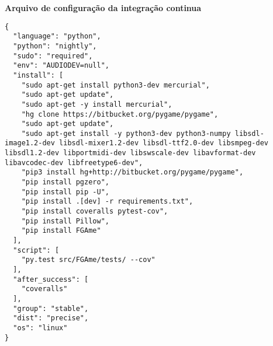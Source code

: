 \pagestyle{empty}


{\LARGE \textbf{Arquivo de configuração da integração continua}}

\begin{anexosenv}
\begin{lstlisting}
{
  "language": "python",
  "python": "nightly",
  "sudo": "required",
  "env": "AUDIODEV=null",
  "install": [
    "sudo apt-get install python3-dev mercurial",
    "sudo apt-get update",
    "sudo apt-get -y install mercurial",
    "hg clone https://bitbucket.org/pygame/pygame",
    "sudo apt-get update",
    "sudo apt-get install -y python3-dev python3-numpy libsdl-image1.2-dev libsdl-mixer1.2-dev libsdl-ttf2.0-dev libsmpeg-dev libsdl1.2-dev libportmidi-dev libswscale-dev libavformat-dev libavcodec-dev libfreetype6-dev",
    "pip3 install hg+http://bitbucket.org/pygame/pygame",
    "pip install pgzero",
    "pip install pip -U",
    "pip install .[dev] -r requirements.txt",
    "pip install coveralls pytest-cov",
    "pip install Pillow",
    "pip install FGAme"
  ],
  "script": [
    "py.test src/FGAme/tests/ --cov"
  ],
  "after_success": [
    "coveralls"
  ],
  "group": "stable",
  "dist": "precise",
  "os": "linux"
}
\end{lstlisting}
\end{anexosenv}
